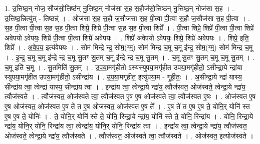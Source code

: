 \documentclass[17pt]{extarticle}
\begin{document}
1. उ॒त्तिष्ठ॒न् नोज॒ सौज॑सो॒त्तिष्ठ॑न् नु॒त्तिष्ठ॒न् नोज॑सा स॒ह स॒हौज॑सो॒त्तिष्ठ॑न् नु॒त्तिष्ठ॒न् नोज॑सा स॒ह । . उ॒त्तिष्ठ॒न्नित्यु॑त् - तिष्ठन्न्॑ । . ओज॑सा स॒ह स॒हौ ज॒सौज॑सा स॒ह पी॒त्वा पी॒त्वा स॒हौ ज॒सौज॑सा स॒ह पी॒त्वा । . स॒ह पी॒त्वा पी॒त्वा स॒ह स॒ह पी॒त्वा शिप्रे॒ शिप्रे॑ पी॒त्वा स॒ह स॒ह पी॒त्वा शिप्रे᳚ । . पी॒त्वा शिप्रे॒ शिप्रे॑ पी॒त्वा पी॒त्वा शिप्रे॑ अवेपयो ऽवेपयः॒ शिप्रे॑ पी॒त्वा पी॒त्वा शिप्रे॑ अवेपयः । . शिप्रे॑ अवेपयो ऽवेपयः॒ शिप्रे॒ शिप्रे॑ अवेपयः । . शिप्रे॒ इति॒ शिप्रे᳚ । . अ॒वे॒प॒य॒ इत्य॑वेपयः । . सोम॑ मिन्द्रे न्द्र॒ सोम॒(ग्म्॒) सोम॑ मिन्द्र च॒मू च॒मू इ॑न्द्र॒ सोम॒(ग्म्॒) सोम॑ मिन्द्र च॒मू । . इ॒न्द्र॒ च॒मू च॒मू इ॑न्द्रे न्द्र च॒मू सु॒तꣳ सु॒तम् च॒मू इ॑न्द्रे न्द्र च॒मू सु॒तम् । . च॒मू सु॒तꣳ सु॒तम् च॒मू च॒मू सु॒तम् । . च॒मू इति॑ च॒मू । . सु॒तमिति॑ सु॒तम् । . उ॒प॒या॒मगृ॑हीतो ऽस्यस्युपया॒मगृ॑हीत उपया॒मगृ॑हीतो॒ ऽसीन्द्रा॒ये न्द्रा॑या स्युपया॒मगृ॑हीत उपया॒मगृ॑हीतो॒ ऽसीन्द्रा॑य । . उ॒प॒या॒मगृ॑हीत॒ इत्यु॑पया॒म - गृ॒ही॒तः॒ । . अ॒सीन्द्रा॒ये न्द्रा॑ यास्य॒ सीन्द्रा॑य त्वा॒ त्वेन्द्रा॑ यास्य॒ सीन्द्रा॑य त्वा । . इन्द्रा॑य त्वा॒ त्वेन्द्रा॒ये न्द्रा॑य॒ त्वौज॑स्वत॒ ओज॑स्वते॒ त्वेन्द्रा॒ये न्द्रा॑य॒ त्वौज॑स्वते । . त्वौज॑स्वत॒ ओज॑स्वते त्वा॒ त्वौज॑स्वत ए॒ष ए॒ष ओज॑स्वते त्वा॒ त्वौज॑स्वत ए॒षः । . ओज॑स्वत ए॒ष ए॒ष ओज॑स्वत॒ ओज॑स्वत ए॒ष ते॑ त ए॒ष ओज॑स्वत॒ ओज॑स्वत ए॒ष ते᳚ । . ए॒ष ते॑ त ए॒ष ए॒ष ते॒ योनि॒र् योनि॑ स्त ए॒ष ए॒ष ते॒ योनिः॑ । . ते॒ योनि॒र् योनि॑ स्ते ते॒ योनि॒ रिन्द्रा॒ये न्द्रा॑य॒ योनि॑ स्ते ते॒ योनि॒ रिन्द्रा॑य । . योनि॒ रिन्द्रा॒ये न्द्रा॑य॒ योनि॒र् योनि॒ रिन्द्रा॑य त्वा॒ त्वेन्द्रा॑य॒ योनि॒र् योनि॒ रिन्द्रा॑य त्वा । . इन्द्रा॑य त्वा॒ त्वेन्द्रा॒ये न्द्रा॑य॒ त्वौज॑स्वत॒ ओज॑स्वते॒ त्वेन्द्रा॒ये न्द्रा॑य॒ त्वौज॑स्वते । . त्वौज॑स्वत॒ ओज॑स्वते त्वा॒ त्वौज॑स्वते । . ओज॑स्वत॒ इत्योज॑स्वते । \newline
\pagebreak
{}
\end{document}
